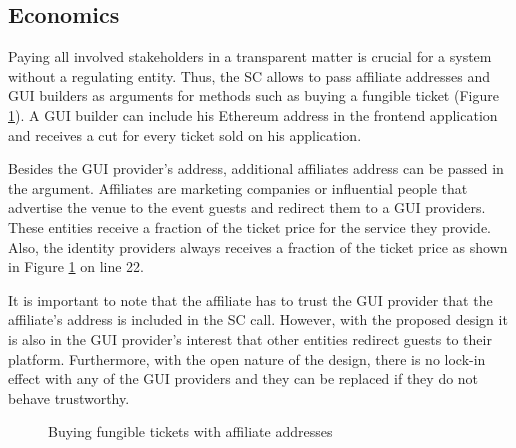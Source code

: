 \subsection{Economics}\label{sc:econom}
Paying all involved stakeholders in a transparent matter is crucial for a system without a regulating entity. Thus, the SC allows to pass affiliate addresses and GUI builders as arguments for methods such as buying a fungible ticket (Figure \ref{code:buy-ticket-function}). A GUI builder can include his Ethereum address in the frontend application and receives a cut for every ticket sold on his application. 

Besides the GUI provider's address, additional affiliates address can be passed in the argument. Affiliates are marketing companies or influential people that advertise the venue to the event guests and redirect them to a GUI providers. These entities receive a fraction of the ticket price for the service they provide. Also, the identity providers always receives a fraction of the ticket price as shown in Figure \ref{code:buy-ticket-function} on line 22. 

It is important to note that the affiliate has to trust the GUI provider that the affiliate's address is included in the SC call. However, with the proposed design it is also in the GUI provider's interest that other entities redirect guests to their platform. Furthermore, with the open nature of the design, there is no lock-in effect with any of the GUI providers and they can be replaced if they do not behave trustworthy.

\begin{figure}[H]
    
    \caption{Buying fungible tickets with affiliate addresses}
    \label{code:buy-ticket-function}
\end{figure}



